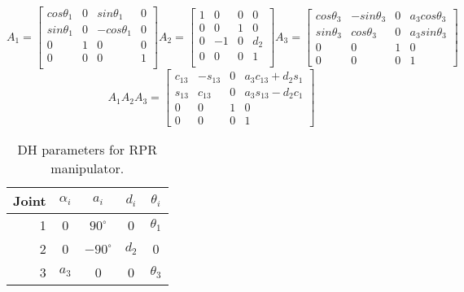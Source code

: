\documentclass[letterpaper,12pt]{report}
\begin{document}
\begin{subequations}
		\begin{equation}
		A_1 = 
		\begin{bmatrix}
			cos\theta_1&0&sin\theta_1&0\\
			sin\theta_1&0&-cos\theta_1&0\\
			0&1&0&0\\
			0&0&0&1\\
		\end{bmatrix}
		\end{equation}
		\begin{equation}
		A_2 = 
		\begin{bmatrix}
			1&0&0&0\\
			0&0&1&0\\
			0&-1&0&d_2\\
			0&0&0&1\\
		\end{bmatrix}
		\end{equation}
		\begin{equation}
		A_3 = 
		\begin{bmatrix}
			cos\theta_3&-sin\theta_3&0&a_3cos\theta_3\\
			sin\theta_3&cos\theta_3&0&a_3sin\theta_3\\
			0&0&1&0\\
			0&0&0&1
		\end{bmatrix}
		\end{equation}
\label{eq:Amatrices}
\end{subequations}
\begin{equation}
A_1A_2A_3 = 
		\begin{bmatrix}
			c_{13}&-s_{13}&0&a_3c_{13}+d_2s_1\\
			s_{13}&c_{13}&0&a_3s_{13}-d_2c_1\\
			0&0&1&0\\
			0&0&0&1
		\end{bmatrix}
\label{eq:A1A2A3}
\end{equation}
\begin{table}
\centering
	\begin{tabular}{r|c c c c}
		Joint&$\alpha_i$&$a_i$&$d_i$&$\theta_i$\\
		\hline
		1&0&$90^\circ$&0&$\theta_1$\\
		2&0&$-90^\circ$&$d_2$&0\\
		3&$a_3$&0&0&$\theta_3$
	\end{tabular}
\caption{DH parameters for RPR manipulator.}
\label{tab:DHtable}
\end{table}
\end{document}
